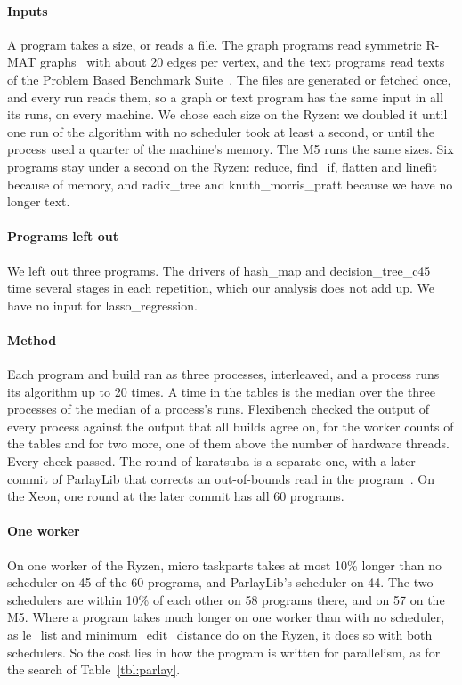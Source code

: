 \documentclass[sigplan,nonacm]{acmart}
\begin{document}
\paragraph{Inputs}
%
A program takes a size, or reads a file.
%
The graph programs read symmetric R-MAT
graphs~\cite{chakrabarti2004rmat} with about 20 edges per vertex, and
the text programs read texts of the Problem Based Benchmark
Suite~\cite{shun2012pbbs}.
%
The files are generated or fetched once, and every run reads them, so
a graph or text program has the same input in all its runs, on every
machine.
%
We chose each size on the Ryzen: we doubled it until one run of the
algorithm with no scheduler took at least a second, or until the
process used a quarter of the machine's memory.
%
The M5 runs the same sizes.
%
Six programs stay under a second on the Ryzen: reduce, find\_if,
flatten and linefit because of memory, and radix\_tree and
knuth\_morris\_pratt because we have no longer text.

\paragraph{Programs left out}
%
We left out three programs.
%
The drivers of hash\_map and decision\_tree\_c45 time several stages
in each repetition, which our analysis does not add up.
%
We have no input for lasso\_regression.

\paragraph{Method}
%
Each program and build ran as three processes, interleaved, and a
process runs its algorithm up to 20 times.
%
A time in the tables is the median over the three processes of the
median of a process's runs.
%
Flexibench checked the output of every process against the output that
all builds agree on, for the worker counts of the tables and for two
more, one of them above the number of hardware threads.
%
Every check passed.
%
The round of karatsuba is a separate one, with a later commit of
ParlayLib that corrects an out-of-bounds read in the
program~\cite{flexibench-suitek,flexibench-suitekgamora}.
%
On the Xeon, one round at the later commit has all 60 programs.

\paragraph{One worker}
%
On one worker of the Ryzen, micro taskparts takes at most 10\% longer
than no scheduler on 45 of the 60 programs, and ParlayLib's scheduler
on 44.
%
The two schedulers are within 10\% of each other on 58 programs
there, and on 57 on the M5.
%
Where a program takes much longer on one worker than with no
scheduler, as le\_list and minimum\_edit\_distance do on the Ryzen, it
does so with both schedulers.
%
So the cost lies in how the program is written for parallelism, as
for the search of Table~\ref{tbl:parlay}.
\end{document}
